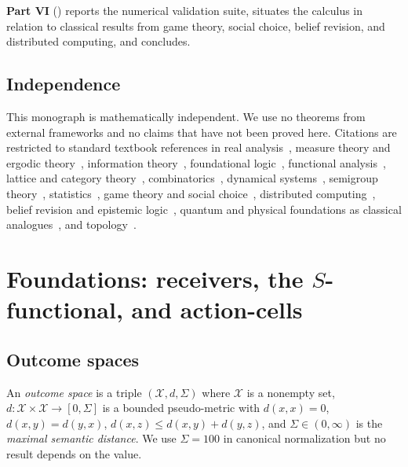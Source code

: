 \documentclass[11pt,twocolumn,a4paper]{article}
\newcommand{\X}{\mathcal{X}}
\begin{document}
\textbf{Part VI}
()
reports the numerical validation suite, situates the calculus in
relation to classical results from game theory, social choice, belief
revision, and distributed computing, and concludes.

\subsection{Independence}

This monograph is mathematically independent. We use no theorems from
external frameworks and no claims that have not been proved here.
Citations are restricted to standard textbook references in real
analysis~\cite{rudin1987,halmos1950}, measure theory and ergodic
theory~\cite{walters1982,birkhoff1931}, information
theory~\cite{shannon1948,coverthomas2006,kullback1951,fisher1925},
foundational logic~\cite{godel1931,tarski1933,turing1936,chaitin1974,
church1936}, functional analysis~\cite{banach1922,koopman1931,
stone1936}, lattice and category
theory~\cite{birkhoff1967,maclane1998,awodey2010,barrwells1990},
combinatorics~\cite{andrews1976,stanley2011}, dynamical
systems~\cite{khalil2002,teschl2012,nakahara2003}, semigroup
theory~\cite{howie1995}, statistics~\cite{lehmann2006,wasserman2004,
kolmogorov1933,borel1909,cantelli1917}, game theory and social
choice~\cite{vonneumannmorgenstern1944,nash1951,schelling1960,
aumann1976,lewis1969,arrow1951,harsanyi1977}, distributed
computing~\cite{fischer1985,lamport1982,lynch1996,shoham2008}, belief
revision and epistemic
logic~\cite{alchourron1985,fagin1995,hintikka1962,aumann1999},
quantum and physical foundations as classical
analogues~\cite{vonneumann1932,heisenberg1927,boltzmann1877,
landauer1961,bennett1973}, and topology~\cite{kelley1955,munkres2000}.

\section{Foundations: receivers, the \texorpdfstring{$S$}{S}-functional,
and action-cells}
\label{sec:foundations}

\subsection{Outcome spaces}

\begin{definition}\label{def:outcome}
An \emph{outcome space} is a triple $(\X,d,\Sigma)$ where $\X$ is a
nonempty set, $d:\X\times\X\to[0,\Sigma]$ is a bounded pseudo-metric
with $d(x,x)=0$, $d(x,y)=d(y,x)$, $d(x,z)\le d(x,y)+d(y,z)$, and
$\Sigma\in(0,\infty)$ is the \emph{maximal semantic distance}. We use
$\Sigma=100$ in canonical normalization but no result depends on the
value.
\end{definition}
\end{document}
